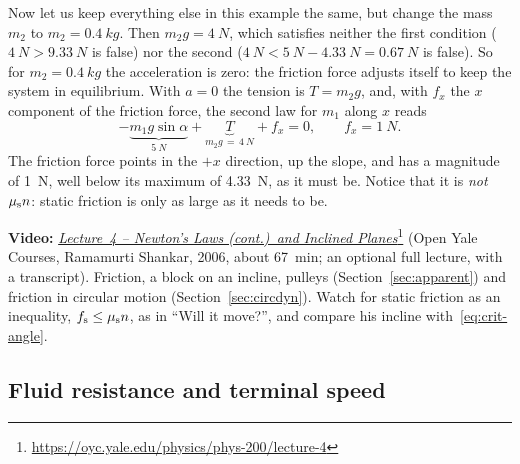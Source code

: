 \documentclass[11pt,a4paper]{article}
\begin{document}
\begin{example}
Now let us keep everything else in this example the same, but change the mass $m_2$ to
$m_2 = \qty{0.4}{kg}$. Then $m_2 g = \qty{4}{N}$, which satisfies neither the first condition
($\qty{4}{N} > \qty{9.33}{N}$ is false) nor the second ($\qty{4}{N} < \qty{5}{N} - \qty{4.33}{N} =
\qty{0.67}{N}$ is false). So for $m_2 = \qty{0.4}{kg}$ the acceleration is zero: the friction force
adjusts itself to keep the system in equilibrium. With $a = 0$ the tension is $T = m_2 g$, and, with
$f_x$ the $x$ component of the friction force, the second law for $m_1$ along $x$ reads
\begin{equation}\label{eq:pi-rest}
  -\underbrace{m_1 g\sin\alpha}_{\qty{5}{N}} + \underbrace{T}_{m_2 g\, =\, \qty{4}{N}} + f_x = 0 ,
  \qquad f_x = \qty{1}{N} .
\end{equation}
The friction force points in the $+x$ direction, up the slope, and has a magnitude of \qty{1}{N}, well
below its maximum of \qty{4.33}{N}, as it must be. Notice that it is \emph{not} $\mu_{\mathrm{s}} n$: static
friction is only as large as it needs to be.
\end{example}

\begin{aside}
\textbf{Video:}
\href{https://oyc.yale.edu/physics/phys-200/lecture-4}{\emph{Lecture~4 -- Newton's Laws (cont.)\
and Inclined Planes}}\footnote{\url{https://oyc.yale.edu/physics/phys-200/lecture-4}} (Open Yale
Courses, Ramamurti Shankar, 2006, about 67~min; an optional full lecture, with a transcript).
Friction, a block on an incline, pulleys (Section~\ref{sec:apparent}) and friction in circular
motion (Section~\ref{sec:circdyn}). Watch for static friction as an inequality,
$f_{\mathrm{s}} \leq \mu_{\mathrm{s}} n$, as in ``Will it move?'', and compare his incline
with~\eqref{eq:crit-angle}.
\end{aside}

\subsection{Fluid resistance and terminal speed}\label{sec:fluid}
\end{document}
